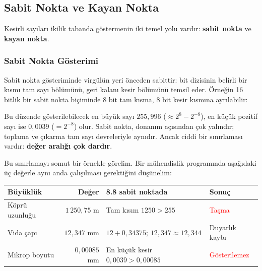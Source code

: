 \subsection{Sabit Nokta ve Kayan Nokta}
\label{sec:sabit-kayan}

Kesirli sayıları ikilik tabanda göstermenin iki temel yolu vardır: \textbf{sabit nokta} ve \textbf{kayan nokta}.

\subsubsection{Sabit Nokta Gösterimi}

Sabit nokta gösteriminde virgülün yeri önceden sabittir: bit dizisinin belirli bir kısmı tam sayı bölümünü, geri kalanı kesir bölümünü temsil eder. Örneğin 16 bitlik bir sabit nokta biçiminde 8 bit tam kısma, 8 bit kesir kısmına ayrılabilir:

\begin{center}
\end{center}

Bu düzende gösterilebilecek en büyük sayı $255{,}996$ ($\approx 2^8 - 2^{-8}$), en küçük pozitif sayı ise $0{,}0039$ ($= 2^{-8}$) olur. Sabit nokta, donanım açısından çok yalındır; toplama ve çıkarma tam sayı devreleriyle aynıdır. Ancak ciddi bir sınırlaması vardır: \textbf{değer aralığı çok dardır}.

Bu sınırlamayı somut bir örnekle görelim. Bir mühendislik programında aşağıdaki üç değerle aynı anda çalışılması gerektiğini düşünelim:

\begin{center}
\small
\begin{tabularx}{\textwidth}{l r X l}
\toprule
\textbf{Büyüklük} & \textbf{Değer} & \textbf{8.8 sabit noktada} & \textbf{Sonuç} \\
\midrule
Köprü uzunluğu & $1\,250{,}75$ m & Tam kısım $1250 > 255$ & \textcolor{red}{Taşma} \\[3pt]
Vida çapı & $12{,}347$ mm & $12 + 0{,}34375$; $12{,}347 \approx 12{,}344$ & Duyarlık kaybı \\[3pt]
Mikrop boyutu & $0{,}00085$ mm & En küçük kesir $0{,}0039 > 0{,}00085$ & \textcolor{red}{Gösterilemez} \\
\bottomrule
\end{tabularx}
\end{center}

